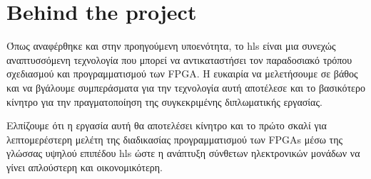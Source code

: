\section{Behind the project}

Όπως αναφέρθηκε και στην προηγούμενη υποενότητα, το \gls{hls} είναι μια συνεχώς αναπτυσσόμενη τεχνολογία που μπορεί να αντικαταστήσει τον παραδοσιακό τρόπου σχεδιασμού και προγραμματισμού των FPGA. Η ευκαιρία να μελετήσουμε σε βάθος και να βγάλουμε συμπεράσματα για την τεχνολογία αυτή αποτέλεσε και το βασικότερο κίνητρο για την πραγματοποίηση της συγκεκριμένης διπλωματικής εργασίας.

Ελπίζουμε ότι η εργασία αυτή θα αποτελέσει κίνητρο και το πρώτο σκαλί για λεπτομερέστερη μελέτη της διαδικασίας προγραμματισμού των FPGAs μέσω της γλώσσας υψηλού επιπέδου \gls{hls} ώστε η ανάπτυξη σύνθετων ηλεκτρονικών μονάδων να γίνει απλούστερη και οικονομικότερη.